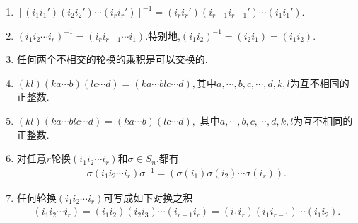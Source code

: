\documentclass[../../main.tex]{subfiles}%
\begin{document}
\begin{proposition}\label{proposition:对换与轮换的基本性质}
\begin{enumerate}[(1)]
\item\label{proposition:对换与轮换的基本性质-1} $[(i_1i_1')(i_2i_2')\cdots (i_ri_r')]^{-1}=(i_ri_r')(i_{r-1}i_{r-1}')\cdots (i_1i_1')$.

\item\label{proposition:对换与轮换的基本性质-2} $(i_1i_2\cdots i_r)^{-1}=(i_ri_{r-1}\cdots i_1).$特别地,$(i_1i_2)^{-1}=(i_2i_1)=(i_1i_2).$

\item\label{proposition:对换与轮换的基本性质-7} 任何两个不相交的轮换的乘积是可以交换的.

\item\label{proposition:对换与轮换的基本性质-4} $(kl)(ka\cdots b)(lc\cdots d) = (ka\cdots blc\cdots d),$其中$a,\cdots,b,c,\cdots,d,k,l$为互不相同的正整数.

\item\label{proposition:对换与轮换的基本性质-5} $(kl)(ka\cdots blc\cdots d) = (ka\cdots b)(lc\cdots d),$
其中$a,\cdots,b,c,\cdots,d,k,l$为互不相同的正整数.

\item\label{proposition:对换与轮换的基本性质-3} 对任意$r$轮换$(i_1i_2\cdots i_r)$和$\sigma \in S_n$,都有
\begin{align*}
\sigma \left( i_1i_2\cdots i_r \right) \sigma ^{-1}=\left( \sigma \left( i_1 \right) \sigma \left( i_2 \right) \cdots \sigma \left( i_r \right) \right) .
\end{align*}

\item\label{proposition:对换与轮换的基本性质-6} 任何轮换$(i_1 i_2 \cdots i_r)$可写成如下对换之积
\begin{align*}
(i_1i_2\cdots i_r)=(i_1i_2)(i_2i_3)\cdots (i_{r-1}i_r)=(i_1i_r)(i_1i_{r-1})\cdots (i_1i_2).
\end{align*}
\end{enumerate}
\end{proposition}
\end{document}

